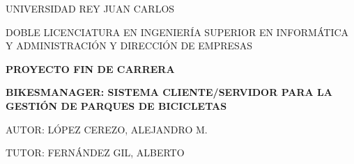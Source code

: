 

\thispagestyle{empty} %

\begin{center}
	
	\vspace*{1.5cm}
	UNIVERSIDAD REY JUAN CARLOS
	\vspace{1cm}
	
	DOBLE LICENCIATURA EN INGENIERÍA SUPERIOR EN INFORMÁTICA Y ADMINISTRACIÓN Y DIRECCIÓN DE EMPRESAS
	\vspace{1cm}

	\begin{figure}[h] %
		\centering
	\end{figure}

	\vspace{1cm}
	{\large \bfseries PROYECTO FIN DE CARRERA}
	\vspace{2.5cm}

	{\large \bfseries BIKESMANAGER: SISTEMA CLIENTE/SERVIDOR PARA LA GESTIÓN DE PARQUES DE BICICLETAS}
	\vspace{2.5cm}

	AUTOR: LÓPEZ CEREZO, ALEJANDRO M.
	\vspace{0.5cm}
	
	TUTOR: FERNÁNDEZ GIL, ALBERTO
	\vspace{1.5cm}
	
\end{center}